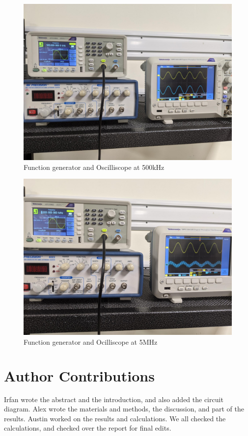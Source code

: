 \documentclass[10pt,twocolumn]{article}
\begin{document}
\begin{figure}[bt]
	\centering
	\includegraphics[width=.9\linewidth]{figures/img1.png}
	\caption{Function generator and Oscilliscope at 500kHz}
	\label{fig:500kHz}
\end{figure}

\begin{figure}[bt]
	\centering
	\includegraphics[width=.9\linewidth]{figures/img2.png}
	\caption{Function generator and Ocilliscope at 5MHz}
	\label{fig:5MHz}
\end{figure}
\section{Author Contributions}

Irfan wrote the abstract and the introduction, and also added the circuit diagram. Alex wrote the materials and methods, the discussion, and part of the results. Austin worked on the results and calculations. We all checked the calculations, and checked over the report for final edits.
\end{document}
